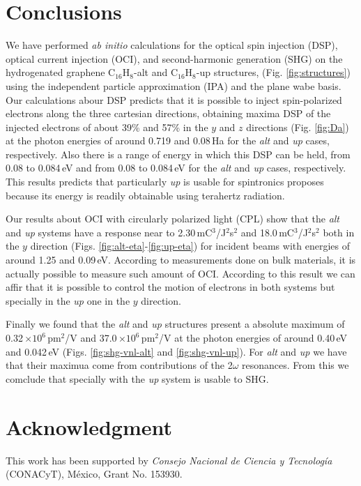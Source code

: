 \documentclass[pss]{wiley2sp} %
\begin{document}
\section{Conclusions}\label{sec:conclusions}

We have performed \emph{ab initio} calculations for the optical spin injection (DSP), optical current injection (OCI), and second-harmonic generation (SHG) on the hydrogenated graphene C$_{16}$H$_{8}$-alt and C$_{16}$H$_{8}$-up structures, (Fig. \ref{fig:structures}) using the independent particle approximation (IPA) and the plane wabe basis. Our calculations abour DSP predicts that it is possible to inject spin-polarized electrons along the three cartesian directions, obtaining maxima DSP of the injected electrons of about 39\% and 57\% in the $y$ and $z$ directions  (Fig. \ref{fig:Da}) at the photon energies of around 0.719 and 0.08\,Ha  for the \emph{alt} and \emph{up} cases, respectively. Also there is a range of energy in which this DSP can be held, from 0.08 to 0.084\,eV and from 0.08 to 0.084\,eV for the \emph{alt} and \emph{up} cases, respectively. This results predicts that particularly \emph{up} is usable for spintronics proposes because its energy is readily obtainable using terahertz radiation.

Our results about OCI with circularly polarized light (CPL) show that the \emph{alt}  and \emph{up} systems have a response near to 2.30\,mC$^{3}$/J$^{2}$s$^{2}$ and 18.0\,mC$^{3}$/J$^{2}$s$^{2}$ both in the $y$ direction (Figs. \ref{fig:alt-eta}-\ref{fig:up-eta}) for incident beams with energies of around 1.25 and 0.09\,eV. According to measurements done on bulk materials, it is actually possible to measure such amount of OCI. According to this result we can affir that it is possible to control the motion of electrons in both systems but specially in the \emph{up} one in the $y$ direction.

Finally we found that the \emph{alt} and \emph{up} structures present a absolute maximum of 0.32\,$\times10^{6} $\,pm$^{2}$/V and 37.0\,$\times10^{6} $\,pm$^{2}$/V at the photon energies of around 0.40\,eV and 0.042\,eV (Figs. \ref{fig:shg-vnl-alt} and \ref{fig:shg-vnl-up}). For \emph{alt} and \emph{up} we have that their maximua come from contributions of the 2$\omega$ resonances. From this we comclude that specially with the \emph{up} system is usable to SHG.


\section{Acknowledgment} %

This work has been supported by \emph{Consejo Nacional de Ciencia y
Tecnolog\'ia} (CONACyT), M\'exico, Grant No. 153930.




\end{document}
